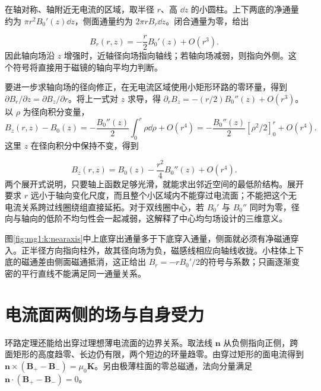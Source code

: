 在轴对称、轴附近无电流的区域，取半径 $r$、高 $\dd z$ 的小圆柱。上下两底的净通量约为 $\pi r^2B_0'(z)\dd z$，侧面通量约为 $2\pi r B_r\dd z$。闭合通量为零，给出

\[
B_r(r,z)=-\frac r2B_0'(z)+O(r^3).
\]
因此轴向场沿 $z$ 增强时，近轴径向场指向轴线；若轴向场减弱，则指向外侧。这个符号将直接用于磁镜的轴向平均力判断。

要进一步求轴向场的径向修正，在无电流区域使用小矩形环路的零环量，得到 $\partial B_r/\partial z=\partial B_z/\partial r$。将上一式对 $z$ 求导，得
$\partial_rB_z=-(r/2)B_0''(z)+O(r^3)$。以 $\rho$ 为径向积分变量，
\[
 B_z(r,z)-B_0(z)
 =-\frac{B_0''(z)}2\int_0^r\rho\dd\rho+O(r^4)
 =-\frac{B_0''(z)}2[\rho^2/2]_0^r+O(r^4).
\]
这里 $z$ 在径向积分中保持不变，得到

\[
B_z(r,z)=B_0(z)-\frac{r^2}{4}B_0''(z)+O(r^4).
\]
两个展开式说明，只要轴上函数足够光滑，就能求出邻近空间的最低阶结构。展开要求 $r$ 远小于轴向变化尺度，而且整个小区域内不能穿过电流面；不能把这个无电流关系跨过线圈绕组直接延拓。对于双线圈中心，若 $B_0'$ 与 $B_0''$ 同时为零，径向与轴向的低阶不均匀性会一起减弱，这解释了中心均匀场设计的三维意义。


图\ref{fig:mg1:k:nearaxis}中上底穿出通量多于下底穿入通量，侧面就必须有净磁通穿入。正半径方向指向柱外，故其径向场为负，磁感线相应向轴线收拢。小柱体上下底的磁通差由侧面磁通抵消，这正给出 $B_r=-rB_0'/2$的符号与系数；只画逐渐变密的平行直线不能满足同一通量关系。


\section{电流面两侧的场与自身受力}
环路定理还能给出穿过理想薄电流面的边界关系。取法线 $\bm n$ 从负侧指向正侧，跨面矩形的高度趋零、长边仍有限，两个短边的环量趋零。由穿过矩形的面电流得到 $\bm n\times(\bm B_+-\bm B_-)=\mu_0\bm K$。另由极薄柱面的零总磁通，法向分量满足 $\bm n\cdot(\bm B_+-\bm B_-)=0$。


